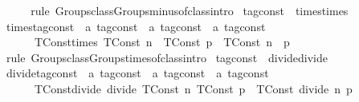 \begin{isabellebody}
\isanewline
\ \ \isamarkupfalse%
%
\isadelimproof
\ %
\endisadelimproof
%
\isatagproof
{}\isamarkupfalse%
\ {\isacharparenleft}rule\ Groups{\isachardot}class{\isachardot}Groups{\isachardot}minus{\isachardot}of{\isacharunderscore}class{\isachardot}intro{\isacharparenright}%
\endisatagproof
{\isafoldproof}%
%
\isadelimproof
%
\endisadelimproof
\isanewline
{}\isamarkupfalse%
\isanewline
\isanewline
{}\isamarkupfalse%
\ tag{\isacharunderscore}const\ {\isacharcolon}{\isacharcolon}\ {\isacharparenleft}times{\isacharparenright}times\isanewline
{}\isanewline
\ \ \isamarkupfalse%
\ times{\isacharunderscore}tag{\isacharunderscore}const\ {\isacharcolon}{\isacharcolon}\ {\isacartoucheopen}{\isacharprime}a\ tag{\isacharunderscore}const\ {\isasymRightarrow}\ {\isacharprime}a\ tag{\isacharunderscore}const\ {\isasymRightarrow}\ {\isacharprime}a\ tag{\isacharunderscore}const{\isacartoucheclose}\ \isanewline
\ \ \isanewline
\ \ \ \ \ \ TConst{\isacharunderscore}times{\isacharcolon}\ {\isacartoucheopen}{\isacharparenleft}TConst\ n{\isacharparenright}\ {\isacharasterisk}\ {\isacharparenleft}TConst\ p{\isacharparenright}\ {\isacharequal}\ {\isacharparenleft}TConst\ {\isacharparenleft}n\ {\isacharasterisk}\ p{\isacharparenright}{\isacharparenright}{\isacartoucheclose}\isanewline
\isanewline
\ \ \isamarkupfalse%
%
\isadelimproof
\ %
\endisadelimproof
%
\isatagproof
{}\isamarkupfalse%
\ {\isacharparenleft}rule\ Groups{\isachardot}class{\isachardot}Groups{\isachardot}times{\isachardot}of{\isacharunderscore}class{\isachardot}intro{\isacharparenright}%
\endisatagproof
{\isafoldproof}%
%
\isadelimproof
%
\endisadelimproof
\isanewline
{}\isamarkupfalse%
\isanewline
\isanewline
{}\isamarkupfalse%
\ tag{\isacharunderscore}const\ {\isacharcolon}{\isacharcolon}\ {\isacharparenleft}divide{\isacharparenright}divide\isanewline
{}\isanewline
\ \ \isamarkupfalse%
\ divide{\isacharunderscore}tag{\isacharunderscore}const\ {\isacharcolon}{\isacharcolon}\ {\isacartoucheopen}{\isacharprime}a\ tag{\isacharunderscore}const\ {\isasymRightarrow}\ {\isacharprime}a\ tag{\isacharunderscore}const\ {\isasymRightarrow}\ {\isacharprime}a\ tag{\isacharunderscore}const{\isacartoucheclose}\ \isanewline
\ \ \isanewline
\ \ \ \ \ \ TConst{\isacharunderscore}divide{\isacharcolon}\ {\isacartoucheopen}divide\ {\isacharparenleft}TConst\ n{\isacharparenright}\ {\isacharparenleft}TConst\ p{\isacharparenright}\ {\isacharequal}\ {\isacharparenleft}TConst\ {\isacharparenleft}divide\ n\ p{\isacharparenright}{\isacharparenright}{\isacartoucheclose}\isanewline

\end{isabellebody}
